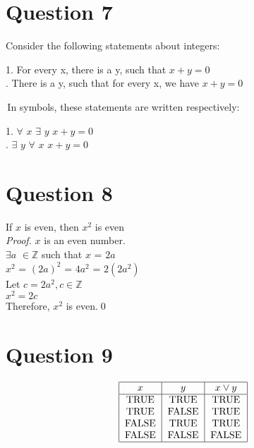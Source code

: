 \documentclass{article}
\newcommand{\Z}{\mathbb{Z}}
\begin{document}
    \section*{Question 7}
    Consider the following statements about integers: \\ \par
    1. For every x, there is a y, such that $x + y = 0$\smallskip\smallskip \\ 
    . There is a y, such that for every x, we have $x + y = 0$ \\ \par
    \,In symbols, these statements are written respectively: \\ \par
    1. $\forall$ $x$ $\exists$ $y$ $x + y = 0$ \smallskip\smallskip\\ 
    . $\exists$ $y$ $\forall$ $x$ $x + y = 0$ \\ 

    \section*{Question 8}
    
    If $x$ is even, then $x^2$ is even \smallskip\smallskip \\ 
    \emph{Proof.} $x$ is an even number.\\
    $\exists a$ $\in\Z$ such that $x$ = $2a$ \\
    $x^2$ = $(2a)^2$ = $4a^2$ = $2(2a^2)$ \\
    Let $c = 2a^2, c\in\Z$ \\
    $x^2 = 2c$ \\
    Therefore, $x^2$ is even.\qed
    
     \section*{Question 9}
    \[\begin{tabular}{|c|c|c|}
    \hline
    $x$ & $y$ & $x\vee y$\\
    \hline
    TRUE & TRUE & TRUE \\
    TRUE & FALSE & TRUE \\
    FALSE & TRUE & TRUE \\
    FALSE & FALSE & FALSE\\
    \hline
    \end{tabular}\]
       
\end{document}

